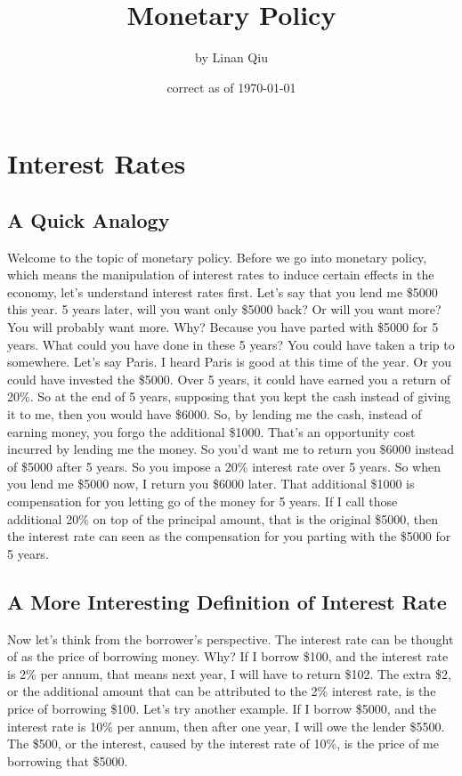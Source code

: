 \documentclass[DIV=calc,11pt,parskip,numbers=noenddot]{scrartcl} %
\title{Monetary Policy}
\author{\large by Linan Qiu}
\date{\small correct as of \today}
\begin{document}
\maketitle
\tableofcontents
\section{Interest Rates}
\subsection{A Quick Analogy}
Welcome to the topic of monetary policy. Before we go into monetary policy, which means the manipulation of interest rates to induce certain effects in the economy, let’s understand interest rates first. Let’s say that you lend me \$5000 this year. 5 years later, will you want only \$5000 back? Or will you want more? You will probably want more. Why? Because you have parted with \$5000 for 5 years. What could you have done in these 5 years? You could have taken a trip to somewhere. Let’s say Paris. I heard Paris is good at this time of the year. Or you could have invested the \$5000. Over 5 years, it could have earned you a return of 20\%. So at the end of 5 years, supposing that you kept the cash instead of giving it to me, then you would have \$6000. So, by lending me the cash, instead of earning money, you forgo the additional \$1000. That’s an opportunity cost incurred by lending me the money. So you’d want me to return you \$6000 instead of \$5000 after 5 years. So you impose a 20\% interest rate over 5 years. So when you lend me \$5000 now, I return you \$6000 later. That additional \$1000 is compensation for you letting go of the money for 5 years. If I call those additional 20\% on top of the principal amount, that is the original \$5000, then the interest rate can seen as the compensation for you parting with the \$5000 for 5 years. 
\subsection{A More Interesting Definition of Interest Rate}
Now let’s think from the borrower’s perspective. The interest rate can be thought of as the price of borrowing money. Why? If I borrow \$100, and the interest rate is 2\% per annum, that means next year, I will have to return \$102. The extra \$2, or the additional amount that can be attributed to the 2\% interest rate, is the price of borrowing \$100. Let’s try another example. If I borrow \$5000, and the interest rate is 10\% per annum, then after one year, I will owe the lender \$5500. The \$500, or the interest, caused by the interest rate of 10\%, is the price of me borrowing that \$5000. 
\end{document}

